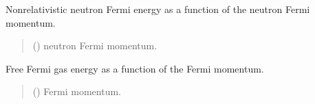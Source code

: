 \documentclass[letterpaper,10pt,english]{sphinxmanual}
\begin{document}

\begin{fulllineitems}
\label{\detokenize{source/api/setup_eos_ffg:nucleardatapy.eos.setup_ffg.eF_n_nr}}
\pysigstartsignatures
{}
\pysigstopsignatures
\sphinxAtStartPar
Non\sphinxhyphen{}relativistic neutron Fermi energy as a function of the neutron Fermi momentum.
\begin{quote}\begin{description}
\sphinxAtStartPar
{} () \textendash{} neutron Fermi momentum.

\end{description}\end{quote}

\end{fulllineitems}


\begin{fulllineitems}
\label{\detokenize{source/api/setup_eos_ffg:nucleardatapy.eos.setup_ffg.effg}}
\pysigstartsignatures
{}
\pysigstopsignatures
\sphinxAtStartPar
Free Fermi gas energy as a function of the Fermi momentum.
\begin{quote}\begin{description}
\sphinxAtStartPar
{} () \textendash{} Fermi momentum.

\end{description}\end{quote}

\end{fulllineitems}
\end{document}

